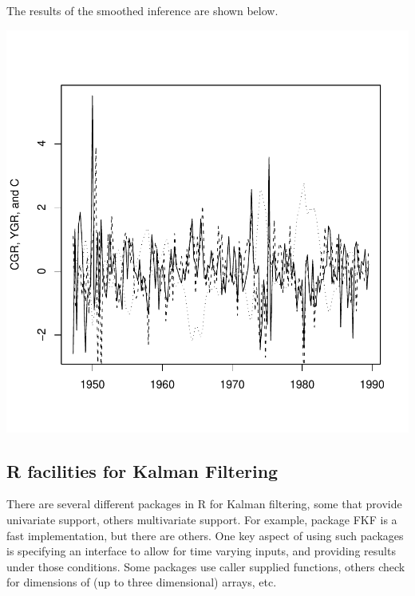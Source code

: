 The results of the smoothed inference are shown below.
\begin{center}
\includegraphics{p376-007}
\end{center}
\subsection{R facilities for Kalman Filtering}
There are several different packages in R for Kalman filtering, some that provide univariate support,
others multivariate support.  For example, package FKF is a fast implementation, but there are others. One key
aspect of using such packages is specifying an interface to allow for time varying inputs, and providing results
under those conditions.  Some packages use caller supplied functions, others check for dimensions of (up to three
dimensional) arrays, etc.

